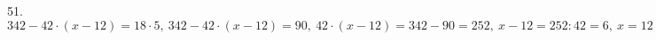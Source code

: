 51. $342-42\cdot(x-12)=18\cdot5,\ 342-42\cdot(x-12)=90,\ 42\cdot(x-12)=342-90=252,\ x-12=252:42=6,\ x=12+6=18.$\\
